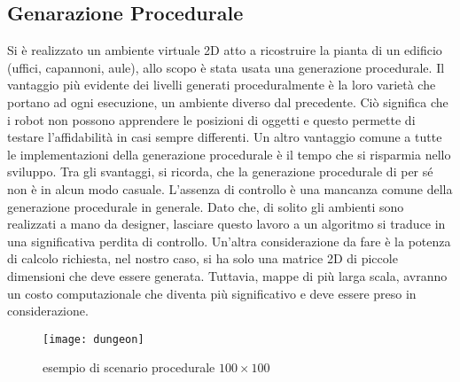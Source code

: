 \subsection{Genarazione Procedurale}
\label{ssec:generazioneproc}
Si è realizzato un ambiente virtuale 2D atto a ricostruire
la pianta di un edificio (uffici, capannoni, aule), allo scopo è stata usata una
generazione procedurale.
Il vantaggio più evidente dei livelli generati proceduralmente è la loro varietà
che portano ad ogni esecuzione, un ambiente diverso dal precedente.
Ciò significa che i robot non possono apprendere le posizioni di oggetti e
questo permette di testare l'affidabilità in casi sempre differenti.
Un altro vantaggio comune a tutte le implementazioni della generazione
procedurale è il tempo che si risparmia nello sviluppo.
Tra gli svantaggi, si ricorda, che la generazione procedurale di per sé non è
in alcun modo casuale.
L'assenza di controllo è una mancanza comune della generazione procedurale in
generale.
Dato che, di solito gli ambienti sono realizzati a mano da designer, lasciare
questo lavoro a un algoritmo si traduce in una significativa perdita di
controllo.
Un'altra considerazione da fare è la potenza di calcolo richiesta, nel nostro
caso, si ha solo una matrice 2D di piccole dimensioni che deve essere generata.
Tuttavia, mappe di più larga scala, avranno un costo computazionale che diventa
più significativo e deve essere preso in
considerazione.\cite{green2016procedural}

\begin{figure}[!htb]
	\centering
	\texttt{[image: dungeon]}
	\caption{esempio di scenario procedurale $100\times100$}
 	\label{fig:dungeon}
\end{figure}


